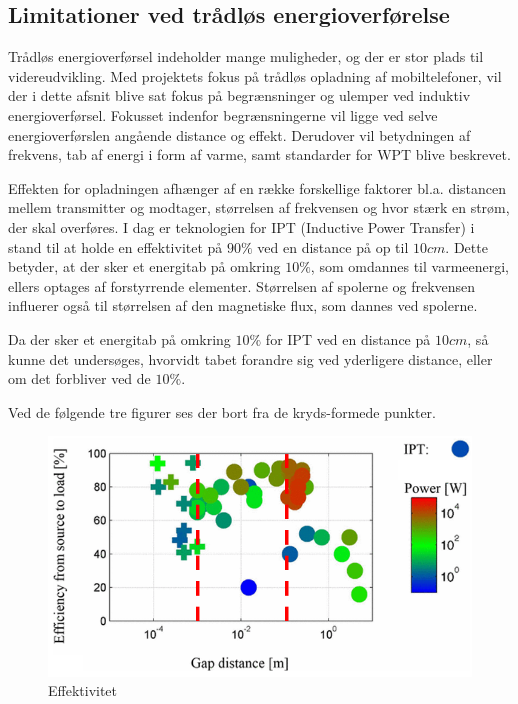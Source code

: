 \subsection{Limitationer ved trådløs energioverførelse }
Trådløs energioverførsel indeholder mange muligheder, og der er stor plads til videreudvikling. Med projektets fokus på trådløs opladning af mobiltelefoner, vil der i dette afsnit blive sat fokus på begrænsninger og ulemper ved induktiv energioverførsel. Fokusset indenfor begrænsningerne vil ligge ved selve energioverførslen angående distance og effekt. Derudover vil betydningen af frekvens, tab af energi i form af varme, samt standarder for WPT blive beskrevet.

Effekten for opladningen afhænger af en række forskellige faktorer bl.a. distancen mellem transmitter og modtager, størrelsen af frekvensen og hvor stærk en strøm, der skal overføres. I dag er teknologien for IPT (Inductive Power Transfer) i stand til at holde en effektivitet på $90\%$ ved en distance på op til $10cm$. Dette betyder, at der sker et energitab på omkring $10\%$, som omdannes til varmeenergi, ellers optages af forstyrrende elementer. Størrelsen af spolerne og frekvensen influerer også til størrelsen af den magnetiske flux, som dannes ved spolerne.

Da der sker et energitab på omkring $10\%$ for IPT ved en distance på $10cm$, så kunne det undersøges, hvorvidt tabet forandre sig ved yderligere distance, eller om det forbliver ved de $10\%$.

Ved de følgende tre figurer ses der bort fra de kryds-formede punkter.

\begin{figure}[H]
\centering
\includegraphics[scale=0.5]{Vildledning/Schematics/Effektivitet_vs_gap.png}
\caption{Effektivitet \cite{limit}}
\label{effektivitet}
\end{figure}

